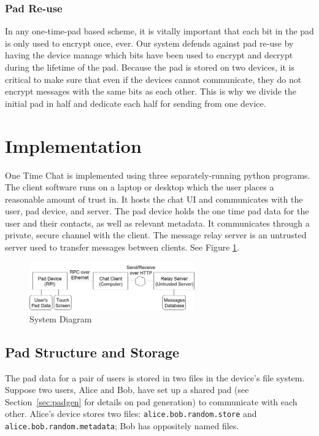 \documentclass[twocolumn]{article}
\begin{document}
\subsubsection{Pad Re-use}
In any one-time-pad based scheme, it is vitally important that each bit in the pad is only used to encrypt once, ever.
Our system defends against pad re-use by having the device manage which bits have been used to encrypt and decrypt during the lifetime of the pad.
Because the pad is stored on two devices, it is critical to make sure that even if the devices cannot communicate, they do not encrypt messages with the same bits as each other. This is why we divide the initial pad in half and dedicate each half for sending from one device.


\section{Implementation}
One Time Chat is implemented using three separately-running python programs.
The client software runs on a laptop or desktop which the user places a reasonable amount of trust in. It hosts the chat UI and communicates with the user, pad device, and server.
The pad device holds the one time pad data for the user and their contacts, as well as relevant metadata. It communicates through a private, secure channel with the client.
The message relay server is an untrusted server used to transfer messages between clients. See Figure \ref{fig:systemd}.

\begin{figure}[htp]
\centering
\includegraphics[width=2.8in]{system-diagram}
\caption{System Diagram}
\label{fig:systemd}
\end{figure}

\subsection{Pad Structure and Storage}
The pad data for a pair of users is stored in two files in the device's file system. Suppose two users, Alice and Bob, have set up a shared pad (see Section~\ref{sec:padgen} for details on pad generation) to communicate with each other. Alice's device stores two files: \texttt{alice.bob.random.store} and \texttt{alice.bob.random.metadata}; Bob has oppositely named files.
\end{document}
